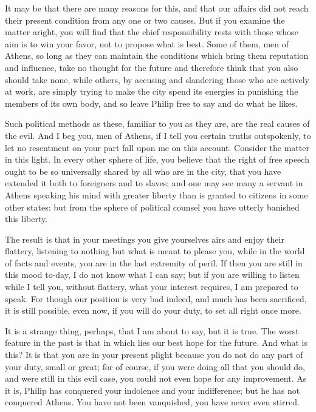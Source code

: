 \documentclass[a4paper]{amsbook}
\begin{document}
It may be that there are many reasons for this, and that our affairs did not reach their present condition from any one or two causes. But if you examine the matter aright, you will find that the chief responsibility rests with those whose aim is to win your favor, not to propose what is best. Some of them, men of Athens, so long as they can maintain the conditions which bring them reputation and influence, take no thought for the future and therefore think that you also should take none, while others, by accusing and slandering those who are actively at work, are simply trying to make the city spend its energies in punishing the members of its own body, and so leave Philip free to say and do what he likes.

Such political methods as these, familiar to you as they are, are the real causes of the evil. And I beg you, men of Athens, if I tell you certain truths outspokenly, to let no resentment on your part fall upon me on this account. Consider the matter in this light. In every other sphere of life, you believe that the right of free speech ought to be so universally shared by all who are in the city, that you have extended it both to foreigners and to slaves; and one may see many a servant in Athens speaking his mind with greater liberty than is granted to citizens in some other states: but from the sphere of political counsel you have utterly banished this liberty.

The result is that in your meetings you give yourselves airs and enjoy their flattery, listening to nothing but what is meant to please you, while in the world of facts and events, you are in the last extremity of peril. If then you are still in this mood to-day, I do not know what I can say; but if you are willing to listen while I tell you, without flattery, what your interest requires, I am prepared to speak. For though our position is very bad indeed, and much has been sacrificed, it is still possible, even now, if you will do your duty, to set all right once more.

It is a strange thing, perhaps, that I am about to say, but it is true. The worst feature in the past is that in which lies our best hope for the future. And what is this? It is that you are in your present plight because you do not do any part of your duty, small or great; for of course, if you were doing all that you should do, and were still in this evil case, you could not even hope for any improvement. As it is, Philip has conquered your indolence and your indifference; but he has not conquered Athens. You have not been vanquished, you have never even stirred.
\end{document}
